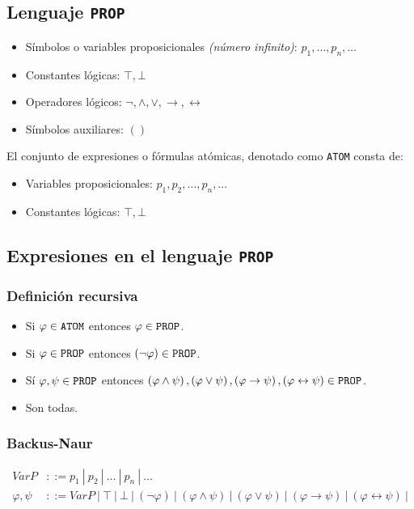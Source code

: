 \documentclass[a4paper]{article}
\begin{document}
\subsection{Lenguaje \texttt{PROP}}
\begin{itemize}
    \item Símbolos o variables proposicionales \textit{(número infinito)}: \(p_{1}, \dotsc, p_{n}, \dotsc\)
    \item Constantes lógicas: \(\top, \bot\)
    \item Operadores lógicos: \(\neg, \land, \lor, \rightarrow, \leftrightarrow \)
    \item Símbolos auxiliares: \(\left(\right)\)
\end{itemize}
El conjunto de expresiones o fórmulas atómicas, denotado como \texttt{ATOM} consta de:
\begin{itemize}
    \item Variables proposicionales: \(p_{1}, p_{2}, \dotsc, p_{n}, \dotsc\)
    \item Constantes lógicas: \(\top, \bot\)
\end{itemize}
\subsection{Expresiones en el lenguaje \texttt{PROP}}
\subsubsection{Definición recursiva}
\begin{itemize}
    \item Si \(\varphi \in \text{\texttt{ATOM}}\) entonces \(\varphi \in \text{\texttt{PROP}}\).
    \item Si \(\varphi \in \text{\texttt{PROP}}\) entonces \(\left(\neg \varphi\right) \in \text{\texttt{PROP}}\).
    \item Sí \(\varphi, \psi \in \text{\texttt{PROP}}\) entonces \(\left(\varphi \land \psi \right), \left(\varphi \lor \psi \right), \left(\varphi \rightarrow \psi \right), \left(\varphi \leftrightarrow \psi \right) \in \text{\texttt{PROP}}\).
    \item Son todas.
\end{itemize}
\subsubsection{Backus-Naur}
\begin{align*}
    VarP &::= p_{1} \ | \ p_{2} \ | \ \dotsc \ | \ p_{n} \ | \ \dotsc  \\
    \varphi, \psi &::= VarP \ | \ \top \ | \ \bot \ | \ \left(\neg \varphi\right)  \ | \ \left(\varphi \land \psi \right) \ | \ \left(\varphi \lor \psi \right)  \ | \ \left(\varphi \rightarrow \psi \right)  \ | \ \left(\varphi \leftrightarrow \psi \right)  \ |
\end{align*}
\end{document}
